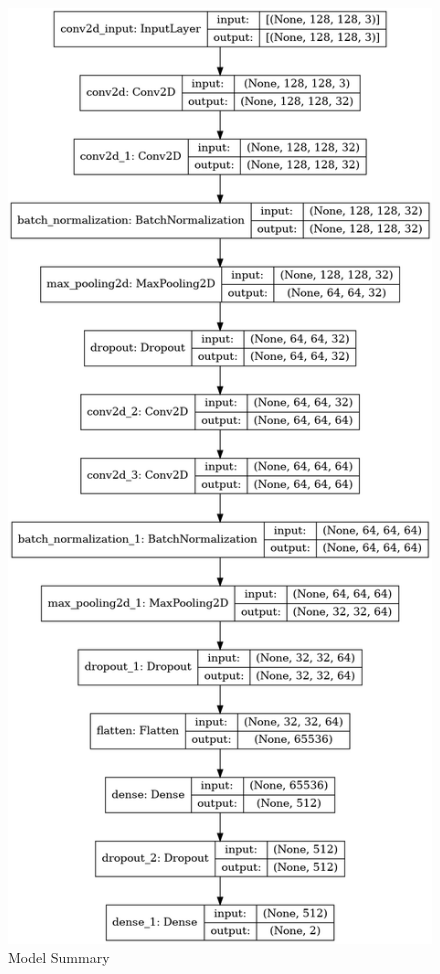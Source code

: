 \begin{figure}[H]
\includegraphics[scale=0.34]{Photos/model_plot.png}
\caption{Model Summary} \label{fig:model_plot}
\end{figure}


